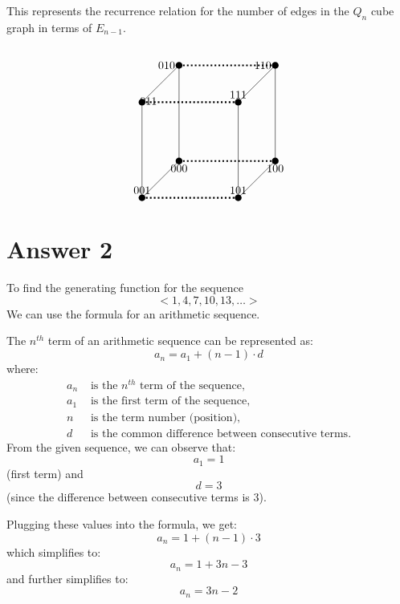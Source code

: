 \documentclass[12pt]{article}
\begin{document}
This represents the recurrence relation for the number of edges in the \( Q_n \) cube graph in terms of \( E_{n-1} \). \\ \\
\[
\begin{tikzpicture}[scale=1.5]
    \coordinate[label=below:000] (000) at (0,0,0);
    \coordinate[label=above:001] (002) at (0,0,2);
    \coordinate[label=left:010] (020) at (0,2,0);
    \coordinate[label={[shift={(0.2,-0.2)}]above:011}] (022) at (0,2,2);
    \coordinate[label=below:100] (200) at (2,0,0);
    \coordinate[label=above:101] (202) at (2,0,2);
    \coordinate[label=left:110] (220) at (2,2,0);
    \coordinate[label=above:111] (222) at (2,2,2);

   \foreach \point in {(000),(002),(020),(022),(200),(202),(220),(222)} {
        \fill \point circle[radius=2pt];
    }
    \draw (000) -- (002) -- (022) -- (020) -- cycle;
    \draw (200) -- (202) -- (222) -- (220) -- cycle;
    \draw[dotted, line width=1.5pt]  (000) -- (200);
    \draw[dotted, line width=1.5pt] (002) -- (202);
    \draw[dotted, line width=1.5pt] (020) -- (220);
    \draw[dotted, line width=1.5pt] (022) -- (222);
\end{tikzpicture}
\]

\section*{Answer 2}

To find the generating function for the sequence
\[ <1, 4, 7, 10, 13, \ldots >\]
We can use the formula for an arithmetic sequence.

The \( n^{th} \) term of an arithmetic sequence can be represented as:
\[ a_n = a_1 + (n - 1) \cdot d \]
where:
\begin{align*}
a_n & \text{ is the } n^{th} \text{ term of the sequence}, \\
a_1 & \text{ is the first term of the sequence}, \\
n & \text{ is the term number (position)}, \\
d & \text{ is the common difference between consecutive terms}.
\end{align*}
From the given sequence, we can observe that:
\[ a_1 = 1 \] (first term)
and
\[ d = 3 \] (since the difference between consecutive terms is 3).

Plugging these values into the formula, we get:
\[ a_n = 1 + (n - 1) \cdot 3 \]
which simplifies to:
\[ a_n = 1 + 3n - 3 \]
and further simplifies to:
\[ a_n = 3n - 2 \]
\end{document}
